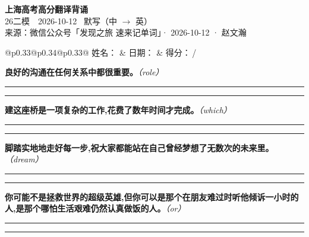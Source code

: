 \documentclass[11pt,a4paper]{article}
\newcommand{\num}[1]{\makebox[1.9em][r]{#1.}\hspace{0.3em}}
\newcommand{\wline}{\noindent\rule{\linewidth}{0.4pt}}
\newcommand{\prompt}[1]{\emph{\textcolor{tipblue}{\small（#1）}}}
\begin{document}
\pagestyle{plain}
\begin{center}
{\LARGE\bfseries 上海高考高分翻译背诵 }\\[0.25em]
{\large 26二模　2026-10-12 \quad\ 默写（中 $\to$ 英）}\\[0.35em]
{\footnotesize 来源：微信公众号「发现之旅 速来记单词」· 2026-10-12 · 赵文瀚}
\end{center}

\vspace{0.4em}
\noindent\begin{tabular}{@{}p{0.33\textwidth}@{}p{0.34\textwidth}@{}p{0.33\textwidth}@{}}
姓名：\underline{\hspace{2.0cm}} & 日期：\underline{\hspace{2.0cm}} & 得分：\underline{\hspace{1.4cm}}\,/ \\
\end{tabular}

\vspace{0.5em}

\vspace{0.8em}
\num{1}\textbf{良好的沟通在任何关系中都很重要。}\prompt{role}

\vspace{0.3em}

\wline\vspace{0.3em}
\wline

\num{2}\textbf{建这座桥是一项复杂的工作,花费了数年时间才完成。}\prompt{which}

\vspace{0.3em}

\wline\vspace{0.3em}
\wline

\num{3}\textbf{脚踏实地地走好每一步,祝大家都能站在自己曾经梦想了无数次的未来里。}\prompt{dream}

\vspace{0.3em}

\wline\vspace{0.3em}
\wline

\num{4}\textbf{你可能不是拯救世界的超级英雄,但你可以是那个在朋友难过时听他倾诉一小时的人,是那个哪怕生活艰难仍然认真做饭的人。}\prompt{or}

\vspace{0.3em}

\wline\vspace{0.3em}
\wline
\end{document}
